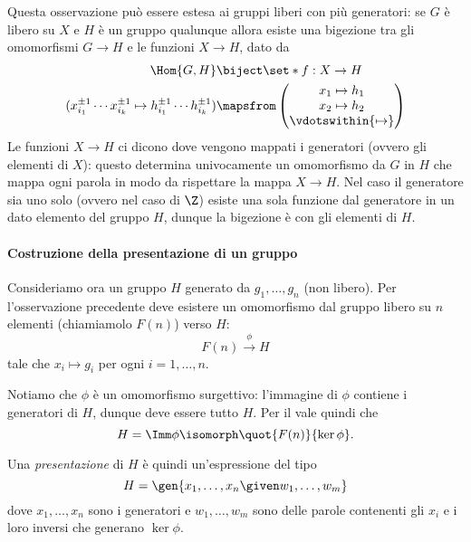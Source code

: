 Questa osservazione può essere estesa ai gruppi liberi con più generatori: se $G$ è libero su $X$ e $H$ è un gruppo qualunque allora esiste una bigezione tra gli omomorfismi $G \to H$ e le funzioni $X \to H$, dato da
\begin{align*}
    \Hom{G, H} &\biject \set*{f : X \to H}\\
    (x_{i_1}^{\pm 1}\cdots x_{i_k}^{\pm 1} \mapsto h_{i_1}^{\pm 1}\cdots h_{i_k}^{\pm 1}) &\mapsfrom \begin{pmatrix}
        x_1 \mapsto h_1 \\
        x_2 \mapsto h_2 \\
        \vdotswithin{\mapsto}
    \end{pmatrix}
\end{align*}
Le funzioni $X \to H$ ci dicono dove vengono mappati i generatori (ovvero gli elementi di $X$): questo determina univocamente un omomorfismo da $G$ in $H$ che mappa ogni parola in modo da rispettare la mappa $X \to H$. Nel caso il generatore sia uno solo (ovvero nel caso di $\Z$) esiste una sola funzione dal generatore in un dato elemento del gruppo $H$, dunque la bigezione è con gli elementi di $H$.

\paragraph{Costruzione della presentazione di un gruppo} Consideriamo ora un gruppo $H$ generato da $g_1, \dots, g_n$ (non libero). Per l'osservazione precedente deve esistere un omomorfismo dal gruppo libero su $n$ elementi (chiamiamolo $F(n)$) verso $H$:
\begin{equation}
        F(n) \xrightarrow{\phi} H
\end{equation} tale che $x_i \mapsto g_i$ per ogni $i = 1, \dots, n$.

Notiamo che $\phi$ è un omomorfismo surgettivo: l'immagine di $\phi$ contiene i generatori di $H$, dunque deve essere tutto $H$. Per il  vale quindi che \begin{equation}
    H = \Imm \phi \isomorph \quot{F(n)}{\ker \phi}.
\end{equation}

Una \emph{presentazione} di $H$ è quindi un'espressione del tipo \begin{equation}
    H = \gen{x_1, \dots, x_n \given w_1, \dots, w_m}
\end{equation} dove $x_1, \dots, x_n$ sono i generatori e $w_1, \dots, w_m$ sono delle parole contenenti gli $x_i$ e i loro inversi che generano $\ker \phi$.

